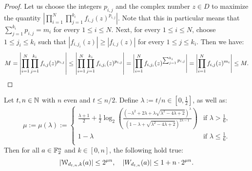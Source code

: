 \documentclass[11pt]{llncs}
\begin{document}
\begin{proof}
    Let us choose the integers $p_{i,j}$ and the complex number $z\in D$ to maximize the quantity $\left|\prod_{i=1}^N\prod_{j=1}^{k_i}f_{i,j}(z)^{p_{i,j}}\right|$. Note that this in particular means that $\sum_{j=1}^{k_i}p_{i,j}=m_i$ for every $1\leq i\leq N$. Next, for every $1\leq i\leq N$, choose $1\leq j_i\leq k_i$ such that $|f_{i,j_i}(z)|\geq|f_{i,j}(z)|$ for every $1\leq j\leq k_i$. Then we have:
    \[
        M=\left|\prod_{i=1}^N\prod_{j=1}^{k_i}f_{i,j}(z)^{p_{i,j}}\right|\leq\left|\prod_{i=1}^N\prod_{j=1}^{k_i}f_{i,j_i}(z)^{p_{i,j}}\right|=\left|\prod_{i=1}^Nf_{i,j_i}(z)^{\sum_{j=1}^{k_i}p_{i,j}}\right|=\left|\prod_{i=1}^Nf_{i,j}(z)^{m_i}\right|\leq M.\qedhere
    \]
\end{proof}

\begin{theorem}\label{theorem:bound_D_nka_generalized}
    Let $t, n\in \mathbb{N}$ with $n$ even and $t\le n/2$. Define $\lambda:=t/n\in\left[0,\frac 12\right]$, as well as:
    \[
        \mu:=\mu(\lambda):=
        \begin{cases}
            \frac{\lambda+1}{2}+\frac12\log_2\left(\frac{\left(-\lambda^2+2\lambda+\lambda\sqrt{\lambda^2-4\lambda+2}\right)^\lambda}{\left(1-\lambda+\sqrt{\lambda^2-4\lambda+2}\right)^{2\lambda-1}}\right)&\text{if $\lambda>\frac 16$,}\\
            1-\lambda&\text{if $\lambda\leq\frac 16$.}\\
        \end{cases}
    \]
    Then for all $a\in\mathbb{F}_2^n$ and $k\in[0,n]$, the following hold true:
    \[
        |\mathcal{W}_{d_{t,n},k}(a)|\leq 2^{\mu n},\quad |W_{d_{t,n}}(a)|\leq 1+n\cdot 2^{\mu n}.
    \]
\end{theorem}
\end{document}
